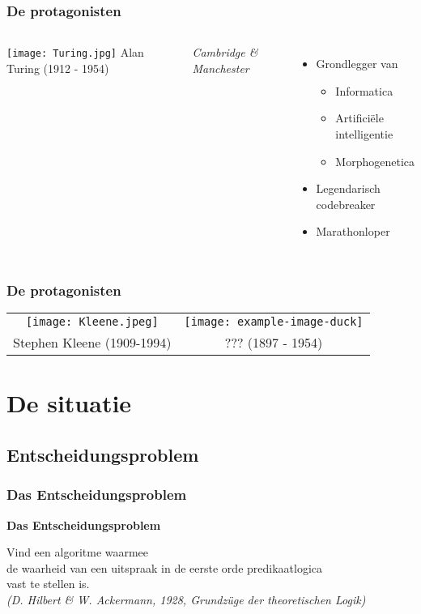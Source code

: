 \documentclass{beamer}
\begin{document}
\begin{frame}
    \frametitle{De protagonisten}
    \begin{columns}
        \texttt{[image: Turing.jpg]}
        {\Large Alan Turing} (1912 - 1954) 

        \emph{Cambridge \& Manchester}
        \begin{itemize}
            \item Grondlegger van
            \begin{itemize}
                \item Informatica
                \item Artificiële intelligentie
                \item Morphogenetica
            \end{itemize}
            \item Legendarisch codebreaker
            \item Marathonloper
        \end{itemize}    
    \end{columns}
\end{frame}

\begin{frame}
    \frametitle{De protagonisten}
    \begin{tabular*}{\textwidth}{c c}
        \texttt{[image: Kleene.jpeg]} & \texttt{[image: example-image-duck]} \\
        {\large Stephen Kleene} (1909-1994) & {\large ???} (1897 - 1954)\\
    \end{tabular*}
\end{frame}

\section{De situatie}
\subsection{Entscheidungsproblem}
\begin{frame}
    \frametitle{Das Entscheidungsproblem}
    {\large \textbf{Das Entscheidungsproblem}}

    \begin{center}
        Vind een algoritme waarmee \\ 
        de waarheid van een uitspraak in de eerste orde predikaatlogica \\
        vast te stellen is.
        \\
        \bigskip
        {\small \emph{(D. Hilbert \& W. Ackermann, 1928, Grundzüge der theoretischen Logik)}}
    \end{center}
\end{frame}
\end{document}
